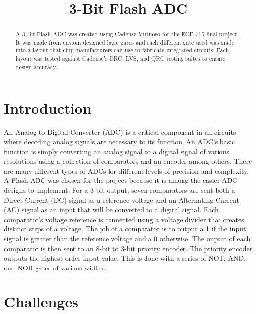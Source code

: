 \documentclass[conference]{IEEEtran}
\begin{document}
\title{3-Bit Flash ADC \\
}

\author{
}

\maketitle

\begin{abstract}
A 3-Bit Flash ADC was created using Cadense Virtuoso for the ECE 715 final project. It was made from custom designed logic gates and each different gate used was made into a layout that chip manufacturers can use to fabricate integrated circuits. Each layout was tested against Cadense's DRC, LVS, and QRC testing suites to ensure design accuracy.
\end{abstract}

\section{Introduction}
An Analog-to-Digital Converter (ADC) is a critical component in all circuits where decoding analog signals are necessary to its funciton. An ADC's basic function is simply converting an analog signal to a digital signal of various resolutions using a collection of comparators and an encoder among others. There are many different types of ADCs for different levels of precision and complexity. A Flash ADC was chosen for the project because it is among the easier ADC designs to implement. For a 3-bit output, seven comparators are sent both a Direct Current (DC) signal as a reference voltage and an Alternating Current (AC) signal as an input that will be converted to a digital signal. Each comparator's voltage reference is connected using a voltage divider that creates distinct steps of a voltage. The job of a comparator is to output a 1 if the input signal is greater than the reference voltage and a 0 otherwise. The ouptut of each comparator is then sent to an 8-bit to 3-bit priority encoder. The priority encoder outputs the highest order input value. This is done with a series of NOT, AND, and NOR gates of various widths. 

\section{Challenges}
\end{document}
